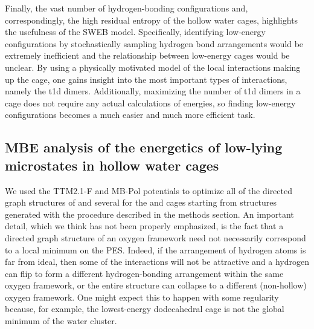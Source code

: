 \documentclass[11pt, proquest]{uwthesis}[2020/02/24]
\let\ce\ch
\begin{document}
\par Finally, the vast number of hydrogen-bonding configurations and, correspondingly, the high residual entropy of the hollow water cages, highlights the usefulness of the SWEB model. Specifically, identifying low-energy configurations by stochastically sampling hydrogen bond arrangements would be extremely inefficient and the relationship between low-energy cages would be unclear. By using a physically motivated model of the local interactions making up the cage, one gains insight into the most important types of interactions, namely the t1d dimers. Additionally, maximizing the number of t1d dimers in a cage does not require any actual calculations of energies, so finding low-energy configurations becomes a much easier and much more efficient task.

\subsection{MBE analysis of the energetics of low-lying microstates in hollow water cages}

\par We used the TTM2.1-F\autocite{fanourgakis_flexible_2006} and MB-Pol\autocite{babin_toward_2012,babin_development_2013,babin_development_2013-1} potentials to optimize all of the directed graph structures of \ce{(H2O)_{20}} and several for the \ce{(H2O)_{24}} and \ce{(H2O)_{28}} cages starting from structures generated with the procedure described in the methods section. An important detail, which we think has not been properly emphasized, is the fact that a directed graph structure of an oxygen framework need not necessarily correspond to a local minimum on the PES. Indeed, if the arrangement of hydrogen atoms is far from ideal, then some of the interactions will not be attractive and a hydrogen can flip to form a different hydrogen-bonding arrangement within the same oxygen framework, or the entire structure can collapse to a different (non-hollow) oxygen framework. One might expect this to happen with some regularity because, for example, the lowest-energy dodecahedral \ce{(H2O)_{20}} cage is not the global minimum of the \ce{(H2O)_{20}} water cluster.\autocite{fanourgakis_high-level_2004}


\end{document}
